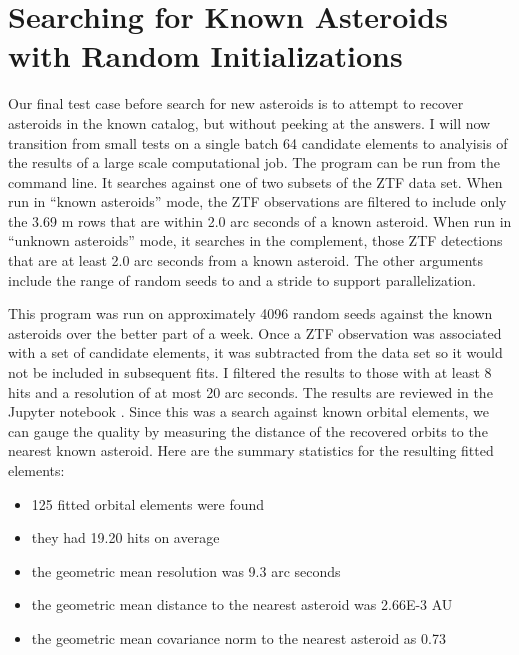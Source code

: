 \section{Searching for Known Asteroids with Random Initializations}
\label{section_results_known_ast_random}
Our final test case before search for new asteroids is to attempt to recover asteroids in the known catalog, but without peeking at the answers.
I will now transition from small tests on a single batch 64 candidate elements to analyisis of the results of a large scale computational job.
The program  can be run from the command line.
It searches against one of two subsets of the ZTF data set.
When run in ``known asteroids'' mode, the ZTF observations are filtered to include only the 3.69 m rows that are within 2.0 arc seconds of a known asteroid.
When run in ``unknown asteroids'' mode, it searches in the complement, those ZTF detections that are at least 2.0 arc seconds from a known asteroid.
The other arguments include the range of random seeds  to  and a stride to support parallelization.

This program was run on approximately 4096 random seeds against the known asteroids over the better part of a week.
Once a ZTF observation was associated with a set of candidate elements, it was subtracted from the data set so it would not be included in subsequent fits.
I filtered the results to those with at least 8 hits and a resolution of at most 20 arc seconds.
The results are reviewed in the Jupyter notebook .
Since this was a search against known orbital elements, 
we can gauge the quality by measuring the distance of the recovered orbits to the nearest known asteroid.
Here are the summary statistics for the resulting fitted elements:
\begin{itemize}
\item 125 fitted orbital elements were found
\item they had 19.20 hits on average
\item the geometric mean resolution was 9.3 arc seconds
\item the geometric mean distance to the nearest asteroid was 2.66E-3 AU
\item the geometric mean covariance norm to the nearest asteroid as 0.73
\end{itemize}

